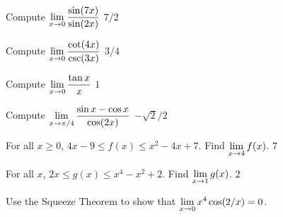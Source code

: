 \exercise Compute $\displaystyle\lim_{x\to 0 } {\sin(7x)\over\sin (2x)}$
\answer $7/2$
\endanswer
\endexercise

\exercise  Compute $\displaystyle\lim_{x\to 0 } {\cot (4x) \over\csc (3x)}$
\answer $3/4$
\endanswer
\endexercise

\exercise Compute $\displaystyle\lim_{x\to 0 } {\tan x\over x}$
\answer $1$
\endanswer

\endtwocol
\endexercise

\exercise Compute $\displaystyle\lim_{x\to \pi/4} {\sin x
    -\cos x \over\cos (2x)}$
 \answer $-\sqrt2/2$
\endanswer
\endexercise

\exercise  For all $x\geq 0$, $4x-9 \leq f(x) \leq x^2 - 4x +7$. Find
  $\displaystyle\lim_{x\to4}f(x)$.
\answer $7$
\endanswer
\endexercise

\exercise  For all $x$, $2x \leq g(x) \leq x^4 - x^2 +2$. Find
  $\displaystyle\lim_{x\to1}g(x)$.
\answer $2$
\endanswer
\endexercise

\exercise Use the Squeeze Theorem to show that $\displaystyle\lim_{x\to0} x^4
 \cos(2/x)=0$.
\endexercise

\endexercises
